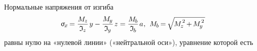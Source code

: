 \documentclass[14pt]{extarticle}
\newcommand{\lquote}[0]{«} %
\newcommand{\rquote}[0]{»} %
\newcommand{\inquotes}[1]{\lquote{#1}\rquote}
\begin{document}
Нормальные напряжения от изгиба
\[
\upsigma_{\hspace{-0.2ex}\scalebox{.8}{$x$}} \hspace{-0.2ex}
= \displaystyle\frac{M_{\hspace{-0.1ex}\scalebox{.8}{$z$}}}{\mathfrak{I}_{\hspace{-0.1ex}\scalebox{.8}{$z$}}} \hspace{.25ex} y
- \displaystyle\frac{M_{\hspace{-0.1ex}\scalebox{.8}{$y$}}}{\mathfrak{I}_{\hspace{-0.1ex}\scalebox{.8}{$y$}}} \hspace{.25ex} z
= \displaystyle\frac{M_{\hspace{-0.1ex}\scalebox{.8}{$b$}}}{\mathfrak{I}_{\hspace{-0.1ex}\scalebox{.8}{$b$}}} \hspace{.25ex} a
\hspace{.1ex} ,
\hspace{.4em}
M_{\hspace{-0.1ex}\scalebox{.8}{$b$}}
\hspace{-0.2ex}=\hspace{-0.2ex} \sqrt{\hspace{-0.2ex}M_{\hspace{-0.1ex}\scalebox{.8}{$z$}}^{\hspace{.2ex}\raisebox{.2em}{$\scriptstyle 2$}} \hspace{-0.2ex}+\hspace{-0.2ex} M_{\hspace{-0.1ex}\scalebox{.8}{$y$}}^{\hspace{.2ex}\raisebox{.2em}{$\scriptstyle 2$}}\hspace{.2ex}}
\]
равны нулю на \inquotes{нулевой линии} (\inquotes{нейтральной оси}), уравнение которой есть
\end{document}
